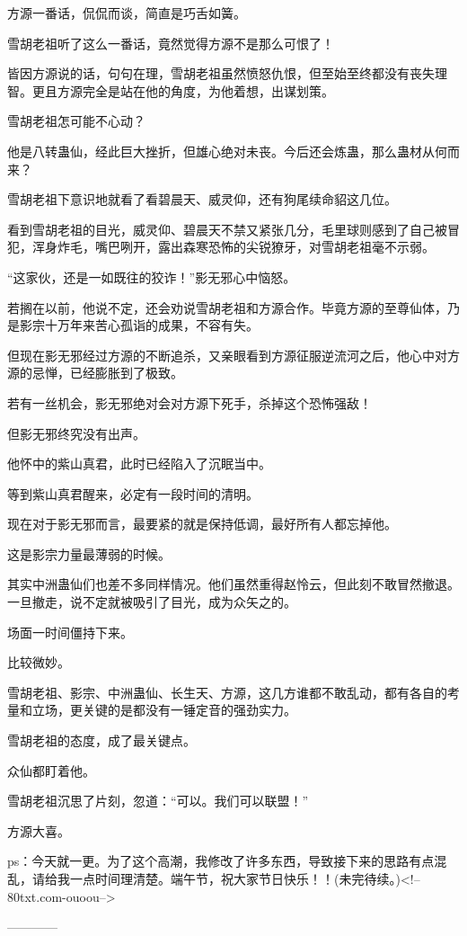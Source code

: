 \begin{this_body}
方源一番话，侃侃而谈，简直是巧舌如簧。

雪胡老祖听了这么一番话，竟然觉得方源不是那么可恨了！

皆因方源说的话，句句在理，雪胡老祖虽然愤怒仇恨，但至始至终都没有丧失理智。更且方源完全是站在他的角度，为他着想，出谋划策。

雪胡老祖怎可能不心动？

他是八转蛊仙，经此巨大挫折，但雄心绝对未丧。今后还会炼蛊，那么蛊材从何而来？

雪胡老祖下意识地就看了看碧晨天、威灵仰，还有狗尾续命貂这几位。

看到雪胡老祖的目光，威灵仰、碧晨天不禁又紧张几分，毛里球则感到了自己被冒犯，浑身炸毛，嘴巴咧开，露出森寒恐怖的尖锐獠牙，对雪胡老祖毫不示弱。

“这家伙，还是一如既往的狡诈！”影无邪心中恼怒。

若搁在以前，他说不定，还会劝说雪胡老祖和方源合作。毕竟方源的至尊仙体，乃是影宗十万年来苦心孤诣的成果，不容有失。

但现在影无邪经过方源的不断追杀，又亲眼看到方源征服逆流河之后，他心中对方源的忌惮，已经膨胀到了极致。

若有一丝机会，影无邪绝对会对方源下死手，杀掉这个恐怖强敌！

但影无邪终究没有出声。

他怀中的紫山真君，此时已经陷入了沉眠当中。

等到紫山真君醒来，必定有一段时间的清明。

现在对于影无邪而言，最要紧的就是保持低调，最好所有人都忘掉他。

这是影宗力量最薄弱的时候。

其实中洲蛊仙们也差不多同样情况。他们虽然重得赵怜云，但此刻不敢冒然撤退。一旦撤走，说不定就被吸引了目光，成为众矢之的。

场面一时间僵持下来。

比较微妙。

雪胡老祖、影宗、中洲蛊仙、长生天、方源，这几方谁都不敢乱动，都有各自的考量和立场，更关键的是都没有一锤定音的强劲实力。

雪胡老祖的态度，成了最关键点。

众仙都盯着他。

雪胡老祖沉思了片刻，忽道：“可以。我们可以联盟！”

方源大喜。

ps：今天就一更。为了这个高潮，我修改了许多东西，导致接下来的思路有点混乱，请给我一点时间理清楚。端午节，祝大家节日快乐！！(未完待续。)<!--80txt.com-ouoou-->

------------

\end{this_body}

